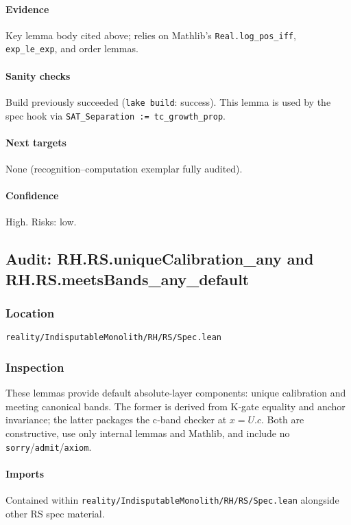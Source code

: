 \documentclass{article}
\newcommand{\FileRef}[1]{\texttt{#1}}
\begin{document}
\paragraph{Evidence}
Key lemma body cited above; relies on Mathlib's \texttt{Real.log\_pos\_iff}, \texttt{exp\_le\_exp}, and order lemmas.

\paragraph{Sanity checks}
Build previously succeeded (\texttt{lake build}: success). This lemma is used by the spec hook via \texttt{SAT\_Separation := tc\_growth\_prop}.

\paragraph{Next targets} None (recognition–computation exemplar fully audited).

\paragraph{Confidence} High. Risks: low.

\subsection{Audit: RH.RS.uniqueCalibration\_any and RH.RS.meetsBands\_any\_default}
\subsubsection{Location}
\FileRef{reality/IndisputableMonolith/RH/RS/Spec.lean}

\subsubsection{Inspection}
These lemmas provide default absolute-layer components: unique calibration and meeting canonical bands. The former is derived from K‑gate equality and anchor invariance; the latter packages the c‑band checker at \(x=U.c\). Both are constructive, use only internal lemmas and Mathlib, and include no \texttt{sorry}/\texttt{admit}/\texttt{axiom}.

\paragraph{Imports}
Contained within \FileRef{reality/IndisputableMonolith/RH/RS/Spec.lean} alongside other RS spec material.
\end{document}
